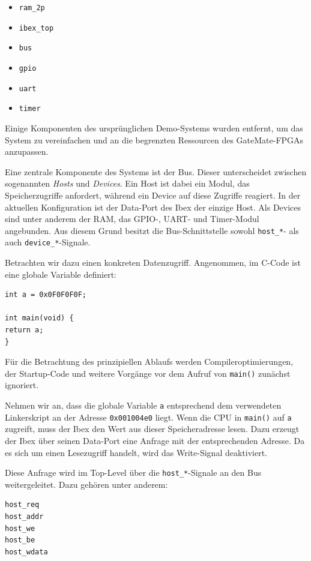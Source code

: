 \documentclass[a4paper,11pt]{article}
\begin{document}
\begin{itemize}
	\item \texttt{ram\_2p}
	\item \texttt{ibex\_top}
	\item \texttt{bus}
	\item \texttt{gpio}
	\item \texttt{uart}
	\item \texttt{timer}
\end{itemize}

Einige Komponenten des ursprünglichen Demo-Systems wurden entfernt, um das System zu vereinfachen und an die begrenzten Ressourcen des GateMate-FPGAs anzupassen.

Eine zentrale Komponente des Systems ist der Bus. Dieser unterscheidet zwischen sogenannten \textit{Hosts} und \textit{Devices}. Ein Host ist dabei ein Modul, das Speicherzugriffe anfordert, während ein Device auf diese Zugriffe reagiert. In der aktuellen Konfiguration ist der Data-Port des Ibex der einzige Host. Als Devices sind unter anderem der RAM, das GPIO-, UART- und Timer-Modul angebunden. Aus diesem Grund besitzt die Bus-Schnittstelle sowohl \texttt{host\_*}- als auch \texttt{device\_*}-Signale.

Betrachten wir dazu einen konkreten Datenzugriff. Angenommen, im C-Code ist eine globale Variable definiert:

\begin{verbatim}
int a = 0x0F0F0F0F;

int main(void) {
return a;
}
\end{verbatim}

Für die Betrachtung des prinzipiellen Ablaufs werden Compileroptimierungen, der Startup-Code und weitere Vorgänge vor dem Aufruf von \texttt{main()} zunächst ignoriert.

Nehmen wir an, dass die globale Variable \texttt{a} entsprechend dem verwendeten Linkerskript an der Adresse \texttt{0x001004e0} liegt. Wenn die CPU in \texttt{main()} auf \texttt{a} zugreift, muss der Ibex den Wert aus dieser Speicheradresse lesen. Dazu erzeugt der Ibex über seinen Data-Port eine Anfrage mit der entsprechenden Adresse. Da es sich um einen Lesezugriff handelt, wird das Write-Signal deaktiviert.

Diese Anfrage wird im Top-Level über die \texttt{host\_*}-Signale an den Bus weitergeleitet. Dazu gehören unter anderem:

\begin{verbatim}
host_req
host_addr
host_we
host_be
host_wdata
\end{verbatim}
\end{document}
